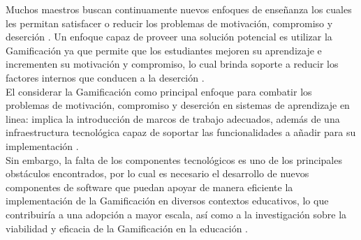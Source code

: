     
    \noindent Muchos maestros buscan continuamente nuevos enfoques de enseñanza los cuales les permitan satisfacer o reducir los problemas de motivación, compromiso y deserción \cite{objetivo1}. 
    Un enfoque capaz de proveer una solución potencial es utilizar la Gamificación ya que permite que los estudiantes mejoren su aprendizaje e incrementen su motivación y compromiso, lo cual brinda soporte a reducir los factores internos que conducen a la deserción \cite{dropoutOnline}.\\
    
    \noindent El considerar la Gamificación como principal enfoque para combatir los problemas de motivación, compromiso y deserción en sistemas de aprendizaje en linea: implica la introducción de marcos de trabajo adecuados, además de una infraestructura tecnológica capaz de soportar las funcionalidades a añadir para su implementación \cite{mappingStudy}.\\
    
    \noindent Sin embargo, la falta de los componentes tecnológicos es uno de los principales obstáculos encontrados, por lo cual es necesario el desarrollo de nuevos componentes de software que puedan apoyar de manera eficiente la implementación de la Gamificación en diversos contextos educativos, lo que contribuiría a una adopción a mayor escala, así como a la investigación sobre la viabilidad y eficacia de la Gamificación en la educación \cite{mappingStudy}.\\
    
    
